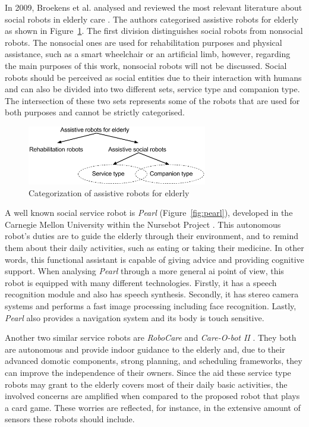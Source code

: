 In 2009, Broekens et al. analysed and reviewed the most relevant literature about social robots in elderly care \cite{Broekens2009}.
The authors categorised assistive robots for elderly as shown in Figure~\ref{fig:categorization}.
The first division distinguishes social robots from nonsocial robots.
The nonsocial ones are used for rehabilitation purposes and physical assistance, such as a smart wheelchair or an artificial limb, however, regarding the main purposes of this work, nonsocial robots will not be discussed.
Social robots should be perceived as social entities due to their interaction with humans and can also be divided into two different sets, service type and companion type.
The intersection of these two sets represents some of the robots that are used for both purposes and cannot be strictly categorised.

\begin{figure}[h!]
  \centering
    \includegraphics[width=0.7\textwidth]{./img/3/categorization_robots}
  \caption{Categorization of assistive robots for elderly}
\label{fig:categorization}
\end{figure}

A well known social service robot is \emph{Pearl} (Figure~\ref{fig:pearl}), developed in the Carnegie Mellon University within the Nursebot Project \cite{Pollack2002}.
This autonomous robot's duties are to guide the elderly through their environment, and to remind them about their daily activities, such as eating or taking their medicine.
In other words, this functional assistant is capable of giving advice and providing cognitive support.
When analysing \emph{Pearl} through a more general \ac{ai} point of view, this robot is equipped with many different technologies.
Firstly, it has a speech recognition module and also has speech synthesis.
Secondly, it has stereo camera systems and performs a fast image processing including face recognition.
Lastly, \emph{Pearl} also provides a navigation system and its body is touch sensitive.

Another two similar service robots are \emph{RoboCare} \cite{Bahadori} and \emph{Care-O-bot II} \cite{Graf2004}.
They both are autonomous and provide indoor guidance to the elderly and, due to their advanced domotic components, strong planning, and scheduling frameworks, they can improve the independence of their owners.
Since the aid these service type robots may grant to the elderly covers most of their daily basic activities, the involved concerns are amplified when compared to the proposed robot that plays a card game.
These worries are reflected, for instance, in the extensive amount of sensors these robots should include.

